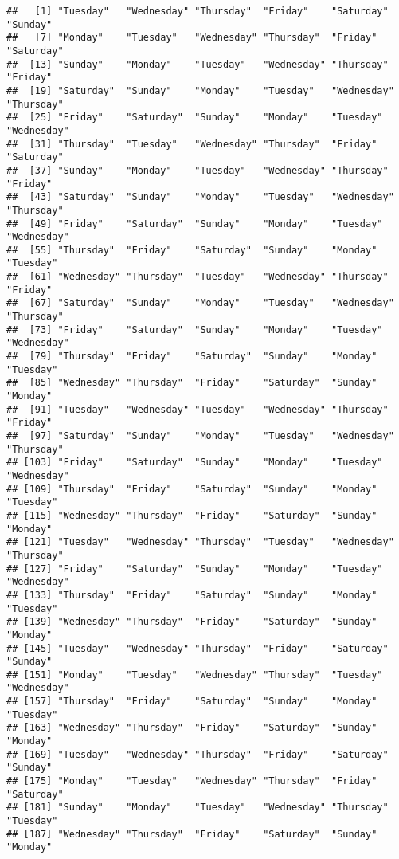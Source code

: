 \documentclass[
]{article}
\begin{document}
\begin{verbatim}
##   [1] "Tuesday"   "Wednesday" "Thursday"  "Friday"    "Saturday"  "Sunday"   
##   [7] "Monday"    "Tuesday"   "Wednesday" "Thursday"  "Friday"    "Saturday" 
##  [13] "Sunday"    "Monday"    "Tuesday"   "Wednesday" "Thursday"  "Friday"   
##  [19] "Saturday"  "Sunday"    "Monday"    "Tuesday"   "Wednesday" "Thursday" 
##  [25] "Friday"    "Saturday"  "Sunday"    "Monday"    "Tuesday"   "Wednesday"
##  [31] "Thursday"  "Tuesday"   "Wednesday" "Thursday"  "Friday"    "Saturday" 
##  [37] "Sunday"    "Monday"    "Tuesday"   "Wednesday" "Thursday"  "Friday"   
##  [43] "Saturday"  "Sunday"    "Monday"    "Tuesday"   "Wednesday" "Thursday" 
##  [49] "Friday"    "Saturday"  "Sunday"    "Monday"    "Tuesday"   "Wednesday"
##  [55] "Thursday"  "Friday"    "Saturday"  "Sunday"    "Monday"    "Tuesday"  
##  [61] "Wednesday" "Thursday"  "Tuesday"   "Wednesday" "Thursday"  "Friday"   
##  [67] "Saturday"  "Sunday"    "Monday"    "Tuesday"   "Wednesday" "Thursday" 
##  [73] "Friday"    "Saturday"  "Sunday"    "Monday"    "Tuesday"   "Wednesday"
##  [79] "Thursday"  "Friday"    "Saturday"  "Sunday"    "Monday"    "Tuesday"  
##  [85] "Wednesday" "Thursday"  "Friday"    "Saturday"  "Sunday"    "Monday"   
##  [91] "Tuesday"   "Wednesday" "Tuesday"   "Wednesday" "Thursday"  "Friday"   
##  [97] "Saturday"  "Sunday"    "Monday"    "Tuesday"   "Wednesday" "Thursday" 
## [103] "Friday"    "Saturday"  "Sunday"    "Monday"    "Tuesday"   "Wednesday"
## [109] "Thursday"  "Friday"    "Saturday"  "Sunday"    "Monday"    "Tuesday"  
## [115] "Wednesday" "Thursday"  "Friday"    "Saturday"  "Sunday"    "Monday"   
## [121] "Tuesday"   "Wednesday" "Thursday"  "Tuesday"   "Wednesday" "Thursday" 
## [127] "Friday"    "Saturday"  "Sunday"    "Monday"    "Tuesday"   "Wednesday"
## [133] "Thursday"  "Friday"    "Saturday"  "Sunday"    "Monday"    "Tuesday"  
## [139] "Wednesday" "Thursday"  "Friday"    "Saturday"  "Sunday"    "Monday"   
## [145] "Tuesday"   "Wednesday" "Thursday"  "Friday"    "Saturday"  "Sunday"   
## [151] "Monday"    "Tuesday"   "Wednesday" "Thursday"  "Tuesday"   "Wednesday"
## [157] "Thursday"  "Friday"    "Saturday"  "Sunday"    "Monday"    "Tuesday"  
## [163] "Wednesday" "Thursday"  "Friday"    "Saturday"  "Sunday"    "Monday"   
## [169] "Tuesday"   "Wednesday" "Thursday"  "Friday"    "Saturday"  "Sunday"   
## [175] "Monday"    "Tuesday"   "Wednesday" "Thursday"  "Friday"    "Saturday" 
## [181] "Sunday"    "Monday"    "Tuesday"   "Wednesday" "Thursday"  "Tuesday"  
## [187] "Wednesday" "Thursday"  "Friday"    "Saturday"  "Sunday"    "Monday"   

\end{verbatim}
\end{document}
